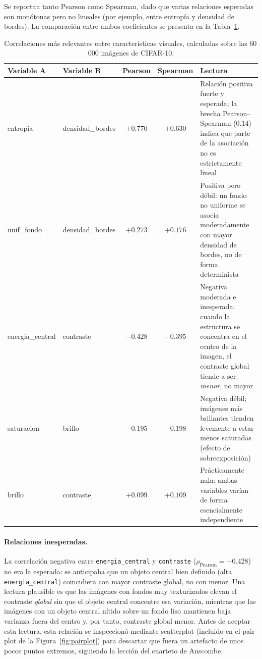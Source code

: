 \documentclass[11pt,a4paper]{article}
\begin{document}
Se reportan tanto Pearson como Spearman, dado que varias relaciones esperadas son
monótonas pero no lineales (por ejemplo, entre entropía y densidad de bordes). La
comparación entre ambos coeficientes se presenta en la
Tabla~\ref{tab:correlaciones}.

\begin{table}[H]
\centering
\small
\begin{tabular}{@{}llccp{5.2cm}@{}}
\toprule
\textbf{Variable A} & \textbf{Variable B} & \textbf{Pearson} & \textbf{Spearman} & \textbf{Lectura} \\
\midrule
entropia & densidad\_bordes & $+0.770$ & $+0.630$ & Relación positiva fuerte y esperada; la brecha Pearson--Spearman ($0.14$) indica que parte de la asociación no es estrictamente lineal \\
unif\_fondo & densidad\_bordes & $+0.273$ & $+0.176$ & Positiva pero débil: un fondo no uniforme se asocia moderadamente con mayor densidad de bordes, no de forma determinista \\
energia\_central & contraste & $-0.428$ & $-0.395$ & Negativa moderada e inesperada: cuando la estructura se concentra en el centro de la imagen, el contraste global tiende a ser \emph{menor}, no mayor \\
saturacion & brillo & $-0.195$ & $-0.198$ & Negativa débil; imágenes más brillantes tienden levemente a estar menos saturadas (efecto de sobreexposición) \\
brillo & contraste & $+0.099$ & $+0.109$ & Prácticamente nula: ambas variables varían de forma esencialmente independiente \\
\bottomrule
\end{tabular}
\caption{Correlaciones más relevantes entre características visuales, calculadas
sobre las 60\,000 imágenes de CIFAR-10.}
\label{tab:correlaciones}
\end{table}

\paragraph{Relaciones inesperadas.} La correlación negativa entre
\texttt{energia\_central} y \texttt{contraste} ($\rho_{\text{Pearson}}=-0.428$)
no era la esperada: se anticipaba que un objeto central bien definido (alta
\texttt{energia\_central}) coincidiera con mayor contraste global, no con menor.
Una lectura plausible es que las imágenes con fondos muy texturizados elevan el
contraste \emph{global} sin que el objeto central concentre esa variación,
mientras que las imágenes con un objeto central nítido sobre un fondo liso
mantienen baja varianza fuera del centro y, por tanto, contraste global menor.
Antes de aceptar esta lectura, esta relación se inspeccionó mediante scatterplot
(incluido en el pair plot de la Figura~\ref{fig:pairplot}) para descartar que
fuera un artefacto de unos pocos puntos extremos, siguiendo la lección del
cuarteto de Anscombe.
\end{document}
